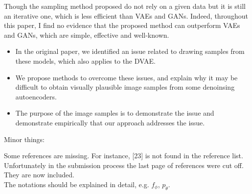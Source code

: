 \documentclass{article}
\begin{document}
{\color{blue}
Though the sampling method proposed do not rely on a given data but it is still an iterative one, which is less efficient than VAEs and GANs. Indeed, throughout this paper, I find no evidence that the proposed method can outperform VAEs and GANs, which are simple, effective and well-known.}\\


\begin{itemize}
    \item In the original paper, we identified an issue related to drawing samples from these models, which also applies to the DVAE.
    \item We propose methods to overcome these issues, and explain why it may be difficult to obtain visually plausible image samples from some denoinsing autoencoders.
    \item {\color{red} The purpose of the image samples is to demonstrate the issue and demonstrate empirically that our approach addresses the issue.}
\end{itemize}

% 



Minor things: \newline

{\color{blue}
Some references are missing. For instance, [23] is not found in the reference list.}\\

Unfortunately in the submission process the last page of references were cut off. They are now included.\\

{\color{blue}
The notations should be explained in detail, e.g. $f_\phi$, $p_\theta$.} \\
\end{document}

